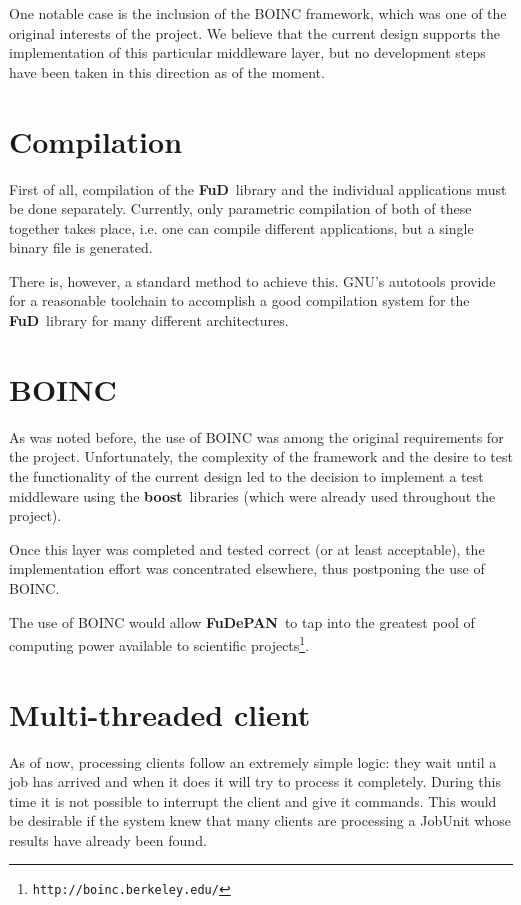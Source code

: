 \documentclass[a4paper,12pt,english]{report}
\newcommand{\fud}{\textbf{FuD}}
\newcommand{\fudepan}{\textbf{FuDePAN}}
\newcommand{\boost}{\textbf{boost}}
\begin{document}
One notable case is the inclusion of the BOINC framework, which was one of the original interests of the project. We believe that the current design supports the implementation of this particular middleware layer, but no development steps have been taken in this direction as of the moment.

\section{Compilation}

First of all, compilation of the \fud \ library and the individual applications must be done separately. Currently, only parametric compilation of both of these together takes place, i.e. one can compile different applications, but a single binary file is generated.

There is, however, a standard method to achieve this. GNU's autotools provide for a reasonable toolchain to accomplish a good compilation system for the \fud \ library for many different architectures.

\section{BOINC}

As was noted before, the use of BOINC was among the original requirements for the project. Unfortunately, the complexity of the framework and the desire to test the functionality of the current design led to the decision to implement a test middleware using the \boost \ libraries (which were already used throughout the project). 

Once this layer was completed and tested correct (or at least acceptable), the implementation effort was concentrated elsewhere, thus postponing the use of BOINC. 

The use of BOINC would allow \fudepan \ to tap into the greatest pool of computing power available to scientific projects\cite{boinc2}\footnote{\texttt{http://boinc.berkeley.edu/}}. 

\section{Multi-threaded client}

As of now, processing clients follow an extremely simple logic: they wait until a job has arrived and when it does  it will try to process it completely. During this time it is not possible to interrupt the client and give it commands. This would be desirable if the system knew that many clients are processing a JobUnit whose results have already been found.
\end{document}
